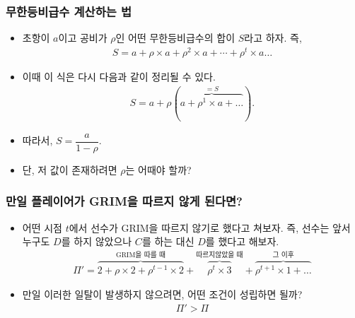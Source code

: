 \documentclass[final]{beamer}
\begin{document}
\begin{frame}\frametitle{무한등비급수 계산하는 법}\vspace{1em}
\begin{itemize}
\item  초항이 $a$이고 공비가 $\rho$인 어떤 무한등비급수의 합이 $S$라고 하자. 즉,
%
\begin{align*}
S = a + \rho \times a + \rho^2 \times a + \cdots + \rho^t \times a \ldots 
\end{align*}
%
\item 이때 이 식은 다시 다음과 같이 정리될 수 있다. 
%
\begin{align*}
S = a + \rho \left( \overbrace{a + \rho^1 \times a + \ldots}^{=S} \right).
\end{align*}
%
\item 따라서, $S = \dfrac{a}{1-\rho}$. \\[0.8em]

\item 단, 저 값이 존재하려면 $\rho$는 어때야 할까? 
\end{itemize}
\end{frame}

\begin{frame}\frametitle{만일 플레이어가 GRIM을 따르지 않게 된다면?}\vspace{2em}
\begin{itemize}
\item  어떤 시점 $t$에서 선수가 GRIM을 따르지 않기로 했다고 쳐보자. 즉, 선수는 앞서 누구도 $D$를 하지 않았으나 $C$를 하는 대신 $D$를 했다고 해보자. 
%
\begin{align*}
\Pi' = \overbrace{2 + \rho \times 2 + \rho^{t-1} \times 2}^{\text{GRIM을 따를 때}} + \overbrace{\rho^t \times 3}^{\text{따르지않았을 때}} + \overbrace{\rho^{t+1} \times 1 + \ldots}^{\text{그 이후}}
\end{align*}
%
\item 만일 이러한 일탈이 발생하지 않으려면, 어떤 조건이 성립하면 될까? 
%
\begin{align*}
\Pi' > \Pi
\end{align*}
%
\end{itemize}
\end{frame}
\end{document}
